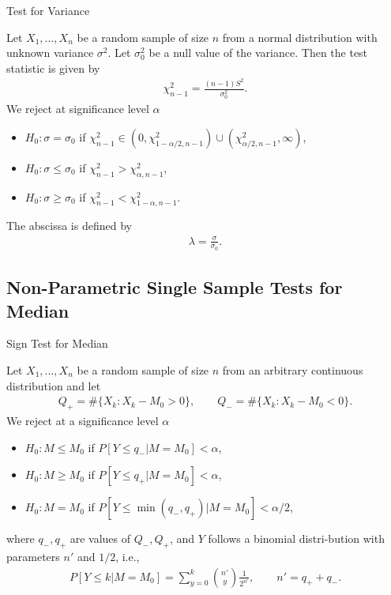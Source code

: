 \begin{frame}{Test for Variance}

\justifying
{} Let $X_1, \ldots, X_n$ be a random sample of size $n$ from a normal distribution with unknown variance $\sigma^2$. Let $\sigma^2_0$ be a null value of the variance. Then the test statistic is given by
\begin{align*}
\chi_{n-1}^2 = \frac{(n-1)S^2}{\sigma_0^2}.
\end{align*}
We reject at significance level $\alpha$
\begin{itemize}
	\item $H_0: \sigma = \sigma_0$ if $\chi_{n-1}^2 \in (0, \chi_{1-\alpha/2, n-1}^2) \cup (\chi_{\alpha/2, n-1}^2, \infty)$,
	\item $H_0: \sigma\leq \sigma_0$ if $\chi_{n-1}^2 > \chi_{\alpha, n-1}^2$,
	\item $H_0: \sigma\geq \sigma_0$ if $\chi_{n-1}^2 < \chi_{1-\alpha, n-1}^2$.
\end{itemize}
 The abscissa is defined by
\begin{align*}
\lambda = \frac{\sigma}{\sigma_0}.
\end{align*}

\end{frame}


\subsection{Non-Parametric Single Sample Tests for Median}

\begin{frame}{Sign Test for Median}

\justifying
{} Let $X_1, \ldots, X_n$ be a random sample of size $n$ from an arbitrary continuous distribution and let 
\begin{align*}
Q_{+} = \#\{X_k: X_k - M_0 > 0\}, \qquad Q_{-} = \#\{X_k: X_k - M_0 < 0\}.
\end{align*}
We reject at a significance level $\alpha$
\begin{itemize}
	\justifying
	\item $H_0: M\leq M_0$ if $P[Y\leq q_-|M = M_0] < \alpha$,
	\item $H_0: M\geq M_0$ if $P[Y\leq q_+|M = M_0] < \alpha$,
	\item $H_0: M = M_0$ if $P[Y\leq \min(q_-, q_+)|M = M_0] < \alpha/2$,
\end{itemize}
where $q_-, q_+$ are values of $Q_-, Q_+$, and $Y$ follows a binomial distri-bution with parameters $n'$ and $1/2$, i.e.,
\begin{align*}
P[Y \leq k|M = M_0] = \sum_{y=0}^k \binom{n'}{y} \frac{1}{2^{n'}}, \qquad n' = q_+ + q_-.
\end{align*}

\end{frame}


